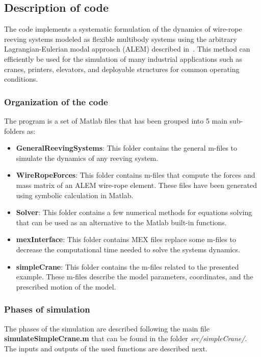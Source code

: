 \subsection{Description of code}

The code implements a systematic formulation of the dynamics of wire-rope reeving systems modeled as flexible multibody systems using the arbitrary Lagrangian-Eulerian modal approach (ALEM) described in~\cite{Escalona2022}. This method can efficiently be used for the simulation of many industrial applications such as cranes, printers, elevators, and deployable structures for common operating conditions.

\subsubsection{Organization of the code}

The program is a set of Matlab files that has been grouped into 5 main sub-folders as:
\begin{itemize}
\item{\textbf{GeneralReevingSystems}: This folder contains the general m-files to simulate the dynamics of any reeving system.}
\item{\textbf{WireRopeForces}: This folder contains m-files that compute the forces and mass matrix of an ALEM  wire-rope element. These files have been generated using symbolic calculation in Matlab.}
\item{\textbf{Solver}: This folder contains a few numerical methods for equations solving that can be used as an alternative to the Matlab built-in functions.}
\item{\textbf{mexInterface}: This folder contains MEX files replace some m-files to decrease the computational time needed to solve the systems dynamics.}
\item{\textbf{simpleCrane}: This folder contains the m-files related to the presented example. These m-files describe the model parameters, coordinates, and the prescribed motion of the model. }
\end{itemize}

\subsubsection{Phases of simulation}

The phases of the simulation are described following the main file \textbf{simulateSimpleCrane.m} that can be found in the folder \textit{src/simpleCrane/}. The inputs and outputs of the used functions are described next. \\

